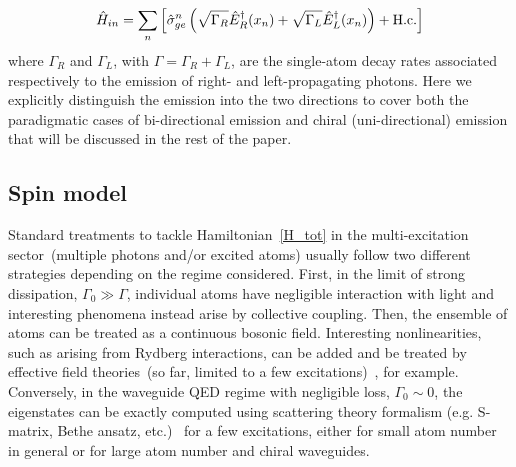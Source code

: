 \documentclass[pra,twocolumn,showpacs,preprintnumbers,amsmath,amssymb]{revtex4-1}
\begin{document}
\begin{equation}\label{H_in}
\hat H_{in}=\sum_n\left[\hat\sigma_{ge}^n\left(\sqrt{\Gamma_R}\hat E_R^{\dagger}(x_n)+\sqrt{\Gamma_L}\hat E_L^{\dagger}(x_n)\right)+ \rm H.c.\right]
\end{equation}
%
where $\Gamma_R$ and $\Gamma_L$, with $\Gamma= \Gamma_R+\Gamma_L$, are the single-atom decay rates associated
respectively to the emission of right- and left-propagating photons. 
Here we explicitly distinguish the emission into the two directions to cover both the paradigmatic cases of bi-directional emission and chiral (uni-directional) emission that will be discussed in the rest of the paper.\\

\subsection{Spin model}\label{Secspin}

Standard treatments to tackle Hamiltonian~\eqref{H_tot} in the multi-excitation sector~(multiple photons and/or excited atoms) usually follow two different strategies depending on the regime considered. First, in the limit of strong dissipation, $\Gamma_0\gg\Gamma$, individual atoms have negligible interaction with light and interesting phenomena instead arise by collective coupling. Then, the ensemble of atoms can be treated as a continuous bosonic field. Interesting nonlinearities, such as arising from Rydberg interactions, can be added and be treated by effective field theories~(so far, limited to a few excitations)~\cite{bienas,Efimov,magrebi}, for example. Conversely, in the waveguide QED regime with negligible loss, $\Gamma_0\sim 0$, the eigenstates can be exactly computed using scattering theory formalism (e.g. S-matrix, Bethe ansatz, etc.)~\cite{shen_fan_prl,shen_fan,Bethe,sahandprl} for a few excitations, either for small atom number in general or for large atom number and chiral waveguides.
\end{document}
